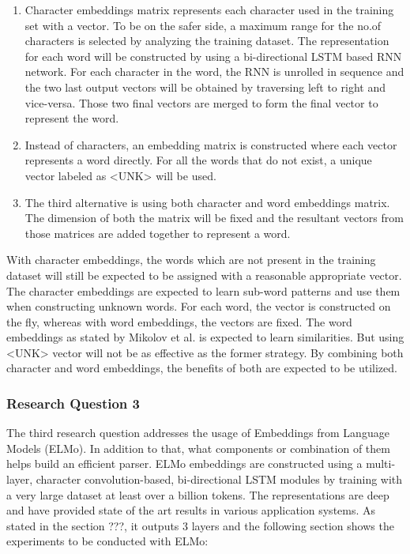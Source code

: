\documentclass[a4paper, 11pt]{article}
\begin{document}
\begin{enumerate}
\item Character embeddings matrix represents each character used in the training set with a vector. To be on the safer side, a maximum range for the no.of characters is selected by analyzing the training dataset. The representation for each word will be constructed by using a bi-directional LSTM based RNN network. For each character in the word, the RNN is unrolled in sequence and the two last output vectors will be obtained by traversing left to right and vice-versa. Those two final vectors are merged to form the final vector to represent the word.
\item Instead of characters, an embedding matrix is constructed where each vector represents a word directly. For all the words that do not exist, a unique vector labeled as <UNK> will be used. 
\item The third alternative is using both character and word embeddings matrix. The dimension of both the matrix will be fixed and the resultant vectors from those matrices are added together to represent a word. 
\end{enumerate}

With character embeddings, the words which are not present in the training dataset will still be expected to be assigned with a reasonable appropriate vector. The character embeddings are expected to learn sub-word patterns and use them when constructing unknown words. For each word, the vector is constructed on the fly, whereas with word embeddings, the vectors are fixed. The word embeddings as stated by Mikolov et al. \parencite{mikolov2013linguistic} is expected to learn similarities. But using <UNK> vector will not be as effective as the former strategy. By combining both character and word embeddings, the benefits of both are expected to be utilized. 
\subsubsection{Research Question 3}

The third research question addresses the usage of Embeddings from Language Models (ELMo). In addition to that, what components or combination of them helps build an efficient parser. ELMo embeddings are constructed using a multi-layer, character convolution-based, bi-directional LSTM modules by training with a very large dataset at least over a billion tokens. The representations are deep and have provided state of the art results in various application systems. As stated in the section ???, it outputs 3 layers and the following section shows the experiments to be conducted with ELMo:
\end{document}

